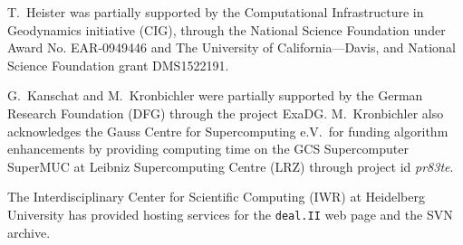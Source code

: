 \documentclass{ansarticle-preprint}
\newcommand{\specialword}[1]{\texttt{#1}}
\newcommand{\dealii}{{\specialword{deal.II}}}
\begin{document}
T.~Heister was partially supported by the Computational Infrastructure in
Geodynamics initiative (CIG), through the National Science Foundation under Award No. EAR-0949446 and The University of California—Davis, and National Science Foundation grant DMS1522191.

G.~Kanschat and M.~Kronbichler were partially supported by the German Research
Foundation (DFG) through the project ExaDG. M.~Kronbichler also acknowledges
the Gauss Centre for Supercomputing e.V.~for funding algorithm enhancements by
providing computing time on the GCS Supercomputer SuperMUC at Leibniz
Supercomputing Centre (LRZ) through project id \emph{pr83te}.

The Interdisciplinary Center for Scientific Computing (IWR) at Heidelberg University has provided
hosting services for the \dealii{} web page and the SVN archive.



{}

\end{document}
